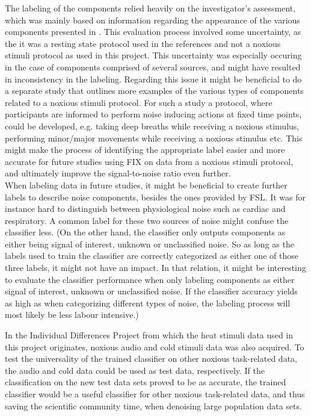 The labeling of the components relied heavily on the investigator’s assessment, which was mainly based on information regarding the appearance of the various components presented in \cite{Salimi-Khorshidi2014, Griffanti2017}. This evaluation process involved some uncertainty, as the it was a resting state protocol used in the references and not a noxious stimuli protocol as used in this project. This uncertainty was especially occuring in the case of components comprised of several sources, and might have resulted in inconsistency in the labeling. Regarding this issue it might be beneficial to do a separate study that outlines more examples of the various types of components related to a noxious stimuli protocol. For such a study a protocol, where participants are informed to perform noise inducing actions at fixed time points, could be developed, e.g. taking deep breaths while receiving a noxious stimulus, performing minor/major movements while receiving a noxious stimulus etc. This might make the process of identifying the appropriate label easier and more accurate for future studies using FIX on data from a noxious stimuli protocol, and ultimately improve the signal-to-noise ratio even further. \\
When labeling data in future studies, it might be beneficial to create further labels to describe noise components, besides the ones provided by FSL. It was for instance hard to distinguish between physiological noise such as cardiac and respiratory. A common label for these two sources of noise might confuse the classifier less. (On the other hand, the classifier only outputs components as either being signal of interest, unknown or unclassified noise. So as long as the labels used to train the classifier are correctly categorized as either one of those three labels, it might not have an impact. In that relation, it might be interesting to evaluate the classifier performance when only labeling components as either signal of interest, unknown or unclassified noise. If the classifier accuracy yields as high as when categorizing different types of noise, the labeling process will most likely be less labour intensive.)

In the Individual Differences Project from which the heat stimuli data used in this project originates, noxious audio and cold stimuli data was also acquired. To test the universality of the trained classifier on other noxious task-related data, the audio and cold data could be used as test data, respectively. If the classification on the new test data sets proved to be as accurate, the trained classifier would be a useful classifier for other noxious task-related data, and thus saving the scientific community time, when denoising large population data sets. \\

